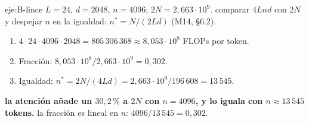 \begin{solucion}{eje:B-lince}
\datos $L=24$, $d=2048$, $n=4096$; $2N=2{,}663\cdot 10^{9}$.
\planteamiento comparar $4Lnd$ con $2N$ y despejar $n$ en la igualdad: $n^{*}=N/(2Ld)$ (M14, §6.2).
\pasos
\begin{enumerate}[label=\arabic*.]
  \item $4\cdot 24\cdot 4096\cdot 2048=805\,306\,368\approx 8{,}053\cdot 10^{8}$ FLOPs por token.
  \item Fracción: $8{,}053\cdot 10^{8}/2{,}663\cdot 10^{9}=0{,}302$.
  \item Igualdad: $n^{*}=2N/(4Ld)=2{,}663\cdot 10^{9}/196\,608=13\,545$.
\end{enumerate}
\resultado \textbf{la atención añade un $30{,}2\,\%$ a $2N$ con $n=4096$, y lo iguala con $n\approx 13\,545$ tokens.}
\comprobacion la fracción es lineal en $n$: $4096/13\,545=0{,}302$.

\end{solucion}

